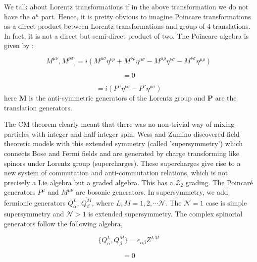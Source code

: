 We talk about Lorentz transformations if in the above transformation we do not have the $ a^{\mu}$ part. Hence, it is pretty obvious to
imagine Poincare transformations as a direct product between Lorentz transformations and group of 4-translations. 
In fact, it is not a direct but semi-direct product of two. 
The Poincare algebra is given by :
 
 \begin{equation}
 M^{\mu\nu} , M^{\rho\sigma}] = i \left (M^{\mu\sigma} \eta^{\nu\rho} + M^{\nu\rho} \eta^{\mu\sigma} - M^{\mu\rho} \eta^{\nu\sigma} - M^{\nu\sigma} \eta^{\mu\rho} \right)
 \end{equation}
 
 \begin{equation}
[P^{\mu}, P^{\nu}] = 0
 \end{equation}
 
\begin{equation}
[M^{\mu\nu}, P^{\sigma}] = i \left(P^{\mu}\eta^{\nu\sigma} - P^{\nu}\eta^{\mu\sigma}\right)
\end{equation}
here $\textbf{M}$ is the anti-symmetric generators of the Lorentz group and $ \textbf{P}$ are the translation generators. 

The CM theorem clearly meant that there was no non-trivial way of mixing particles with integer and half-integer spin. 
Wess and Zumino discovered field theoretic models with this extended symmetry (called 'supersymmetry') 
which connects Bose and Fermi fields and are generated by charge transforming like spinors under Lorentz group 
(supercharges). These supercharges give rise to a new system of commutation and anti-commutation relations, 
which is not precisely a Lie algebra but a graded algebra. This has a $ \mathcal{Z}_{2}$ grading. 
The Poincar\'{e} generators $ P^\mu$ and $M^{\mu\nu}$ are bosonic generators. In supersymmetry, we add fermionic generators $Q_{\alpha}^{L}$, $\overline{Q_{\beta}^{M}}$, where
$L, M = 1,2, \cdots \mathcal{N}$. The $\mathcal{N} = 1 $ case is simple supersymmetry and $\mathcal{N}  > 1$ is extended supersymmetry. 
The complex spinorial generators follow the following algebra, 

\begin{equation} 
\{Q_{\alpha}^{L}, Q_{\beta}^{M}\} = \epsilon_{\alpha\beta} Z^{LM}
\end{equation} 

\begin{equation} 
 [P,Q] = 0
 \end{equation} 

